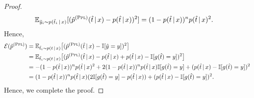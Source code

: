 \begin{proof}
\begin{equation*}
\begin{aligned}
        & \mathbb{E}_{\tilde{y}_i \sim {p}(\tilde{t}_i \,|\, x)} [ (\hat{p}^{(\textsc{Ppl})}(\hat{t} \,|\, x) - p(\hat{t} \,|\, x))^2] = (1 - p(\hat{t} \,|\, x)) ^ n p(\hat{t} \,|\, x)^2 .
    \end{aligned}
    \end{equation*}
    Hence,
    \begin{equation*}
        \begin{aligned}
          \mathcal{E}(\hat{p}^{(\textsc{Ppl})}) &= \mathbb{E}_{\tilde{t}_i \sim p(t \,|\, x)} \big[( \hat{p}^{(\textsc{Ppl})}(\hat{t} \,|\, x) - \mathbb{I}[\hat{y} = y] )^2 \big] \\
	& =\mathbb{E}_{\tilde{t}_i \sim p(t \,|\, x)}\big[(\hat{p}^{(\textsc{Ppl})}(\hat{t} \,|\, x) - p(\hat{t} \,|\, x) + p(\hat{t} \,|\, x) - \mathbb{I}[g(\hat{t}) = y] )^2 \big] \\
	& = - (1 - p(\hat{t} \,|\, x)) ^ n p(\hat{t} \,|\, x)^2 + 2 (1 - p(\hat{t} \,|\, x)) ^ n p(\hat{t} \,|\, x) \mathbb{I}[g(\hat{t}) = y] + (p(\hat{t} \,|\, x) - \mathbb{I}[g(\hat{t}) = y] )^2 \\
	& = (1 - p(\hat{t} \,|\, x)) ^ n p(\hat{t} \,|\, x) (2\mathbb{I}[g(\hat{t}) = y] - p(\hat{t} \,|\, x)) + (p(\hat{t} \,|\, x) - \mathbb{I}[g(\hat{t}) = y] )^2.
        \end{aligned}
        \end{equation*}
Hence, we complete the proof.
\end{proof}

